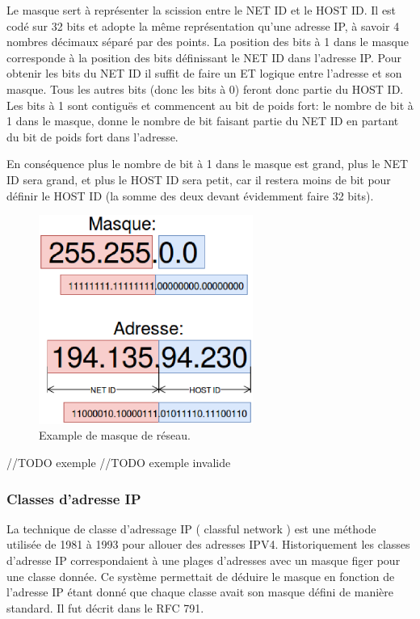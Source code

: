 Le masque sert à représenter la scission entre le NET ID et le HOST ID.
Il est codé sur 32 bits et adopte la même représentation qu'une adresse IP, à savoir
4 nombres décimaux séparé par des points.
La position des bits à 1 dans le masque corresponde à la position des bits définissant le NET ID dans l'adresse IP.
Pour obtenir les bits du NET ID il suffit de faire un ET logique entre l'adresse et son masque. Tous les autres bits (donc les bits à 0)
feront donc partie du HOST ID.
Les bits à 1 sont contiguës et commencent au bit de poids fort: le nombre de bit à 1 dans le masque, donne
le nombre de bit faisant partie du NET ID en partant du bit de poids fort dans l'adresse.

En conséquence plus le nombre de bit à 1 dans le masque est grand, plus le NET ID sera grand, et plus le HOST ID sera petit, car il restera moins de bit pour définir le HOST ID (la somme des deux devant évidemment faire 32 bits).

\begin{figure}
\centering
\includegraphics[width=7cm]{./pics/maskipv4.eps}
\caption{Example de masque de réseau.}
\label{fig:exmask}
\end{figure}

//TODO exemple
//TODO exemple invalide

\subsubsection{Classes d'adresse IP}
La technique de classe d'adressage IP ( classful network ) est une méthode
utilisée de 1981 à 1993 pour allouer des adresses IPV4.
Historiquement les classes d'adresse IP correspondaient à une plages d'adresses avec un masque figer pour une classe donnée.
Ce système permettait de déduire le masque en fonction
de l'adresse IP étant donné que chaque classe avait son masque défini de manière standard.
Il fut décrit dans le RFC 791\cite{url-RFC-791}.

